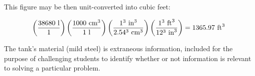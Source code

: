 This figure may be then unit-converted into cubic feet:

\vskip 10pt

$$\left(38680 \hbox{ l} \over 1 \right) \left(1000 \hbox{ cm}^3 \over 1 \hbox{ l}\right) \left(1^3 \hbox{ in}^3 \over 2.54^3 \hbox{ cm}^3\right) \left(1^3 \hbox{ ft}^3 \over 12^3 \hbox{ in}^3\right) = 1365.97 \hbox{ ft}^3$$

\vskip 10pt

The tank's material (mild steel) is extraneous information, included for the purpose of challenging students to identify whether or not information is relevant to solving a particular problem.




